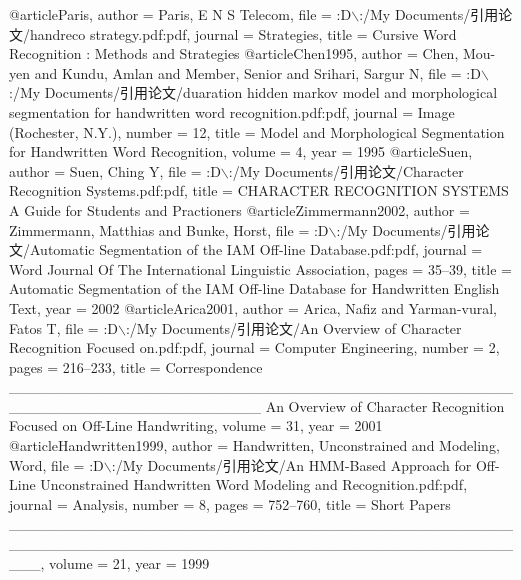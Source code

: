 @article{Paris,
author = {Paris, E N S Telecom},
file = {:D$\backslash$:/My Documents/引用论文/handreco strategy.pdf:pdf},
journal = {Strategies},
title = {{Cursive Word Recognition : Methods and Strategies}}
}
@article{Chen1995,
author = {Chen, Mou-yen and Kundu, Amlan and Member, Senior and Srihari, Sargur N},
file = {:D$\backslash$:/My Documents/引用论文/duaration hidden markov model and morphological segmentation for handwritten word recognition.pdf:pdf},
journal = {Image (Rochester, N.Y.)},
number = {12},
title = {{Model and Morphological Segmentation for Handwritten Word Recognition}},
volume = {4},
year = {1995}
}
@article{Suen,
author = {Suen, Ching Y},
file = {:D$\backslash$:/My Documents/引用论文/Character Recognition Systems.pdf:pdf},
title = {{CHARACTER RECOGNITION SYSTEMS A Guide for Students and Practioners}}
}
@article{Zimmermann2002,
author = {Zimmermann, Matthias and Bunke, Horst},
file = {:D$\backslash$:/My Documents/引用论文/Automatic Segmentation of the IAM Off-line Database.pdf:pdf},
journal = {Word Journal Of The International Linguistic Association},
pages = {35--39},
title = {{Automatic Segmentation of the IAM Off-line Database for Handwritten English Text}},
year = {2002}
}
@article{Arica2001,
author = {Arica, Nafiz and Yarman-vural, Fatos T},
file = {:D$\backslash$:/My Documents/引用论文/An Overview of Character Recognition Focused on.pdf:pdf},
journal = {Computer Engineering},
number = {2},
pages = {216--233},
title = {{Correspondence \_\_\_\_\_\_\_\_\_\_\_\_\_\_\_\_\_\_\_\_\_\_\_\_\_\_\_\_\_\_\_\_\_\_\_\_\_\_\_\_\_\_\_\_\_\_\_\_\_\_\_\_\_\_\_\_\_\_\_\_\_\_\_\_\_\_\_\_\_\_\_\_ An Overview of Character Recognition Focused on Off-Line Handwriting}},
volume = {31},
year = {2001}
}
@article{Handwritten1999,
author = {Handwritten, Unconstrained and Modeling, Word},
file = {:D$\backslash$:/My Documents/引用论文/An HMM-Based Approach for Off-Line Unconstrained Handwritten Word Modeling and Recognition.pdf:pdf},
journal = {Analysis},
number = {8},
pages = {752--760},
title = {{Short Papers \_\_\_\_\_\_\_\_\_\_\_\_\_\_\_\_\_\_\_\_\_\_\_\_\_\_\_\_\_\_\_\_\_\_\_\_\_\_\_\_\_\_\_\_\_\_\_\_\_\_\_\_\_\_\_\_\_\_\_\_\_\_\_\_\_\_\_\_\_\_\_\_\_\_\_\_\_\_\_\_\_\_\_\_\_\_\_\_\_\_\_\_\_\_\_\_\_\_\_}},
volume = {21},
year = {1999}
}

